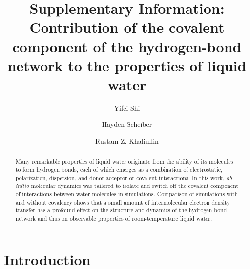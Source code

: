 \documentclass[10pt,amsmath,twocolumn,aps,prl,superscriptaddress,floatfix]{revtex4-1}
\newcommand*{\MAINTEXT}{}
\begin{document}
\title{
\ifdefined\MAINTEXT
\else
Supplementary Information: \\
\fi
Contribution of the covalent component of the hydrogen-bond network to the properties of liquid water
}

\author{Yifei Shi}
\author{Hayden Scheiber}
\author{Rustam Z. Khaliullin}





\ifdefined\MAINTEXT
\begin{abstract}
Many remarkable properties of liquid water originate from the ability of its molecules to form hydrogen bonds, each of which emerges as a combination of electrostatic, polarization, dispersion, and donor-acceptor or covalent interactions.
In this work, \emph{ab initio} molecular dynamics was tailored to isolate and switch off the covalent component of interactions between water molecules in simulations. 
Comparison of simulations with and without covalency shows that a small amount of intermolecular electron density transfer has a profound effect on the structure and dynamics of the hydrogen-bond network and thus on observable properties of room-temperature liquid water. 
\end{abstract}

\maketitle


\section{Introduction} 
\end{document}
